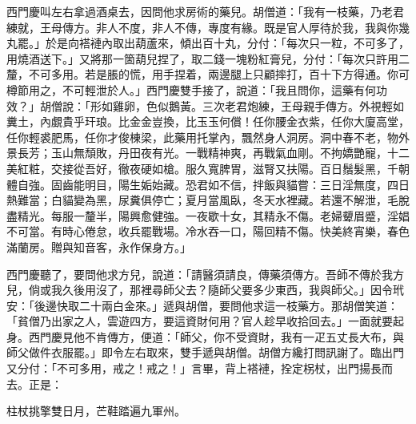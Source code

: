 西門慶叫左右拿過酒桌去，因問他求房術的藥兒。胡僧道：「我有一枝藥，乃老君練就，王母傳方。非人不度，非人不傳，專度有緣。既是官人厚待於我，我與你幾丸罷。」於是向褡褳內取出葫蘆來，傾出百十丸，分付：「每次只一粒，不可多了，用燒酒送下。」又將那一箇葫兒捏了，取二錢一塊粉紅膏兒，分付：「每次只許用二釐，不可多用。若是脹的慌，用手捏着，兩邊腿上只顧摔打，百十下方得通。你可樽節用之，不可輕泄於人。」西門慶雙手接了，說道：「我且問你，這藥有何功效？」胡僧說：「形如雞卵，色似鵝黃。三次老君炮練，王母親手傳方。外視輕如糞土，內覷貴乎玕琅。比金金豈換，比玉玉何償！任你腰金衣紫，任你大廈高堂，任你輕裘肥馬，任你才俊棟梁，此藥用托掌內，飄然身人洞房。洞中春不老，物外景長芳；玉山無頹敗，丹田夜有光。一戰精神爽，再戰氣血剛。不拘嬌艷寵，十二美紅粧，交接從吾好，徹夜硬如槍。服久寬脾胃，滋腎又扶陽。百日鬚髮黑，千朝體自強。固齒能明目，陽生姤始藏。恐君如不信，拌飯與貓嘗：三日淫無度，四日熱難當；白貓變為黑，尿糞俱停亡；夏月當風臥，冬天水裡藏。若還不解泄，毛脫盡精光。每服一釐半，陽興愈健強。一夜歇十女，其精永不傷。老婦顰眉蹙，淫娼不可當。有時心倦怠，收兵罷戰場。冷水吞一口，陽回精不傷。快美終宵樂，春色滿蘭房。贈與知音客，永作保身方。」

西門慶聽了，要問他求方兒，說道：「請醫須請良，傳藥須傳方。吾師不傳於我方兒，倘或我久後用沒了，那裡尋師父去？隨師父要多少東西，我與師父。」因令玳安：「後邊快取二十兩白金來。」遞與胡僧，要問他求這一枝藥方。那胡僧笑道：「貧僧乃出家之人，雲遊四方，要這資財何用？{}官人趁早收拾回去。」一面就要起身。西門慶見他不肯傳方，便道：「師父，你不受資財，我有一疋五丈長大布，與師父做件衣服罷。」即令左右取來，雙手遞與胡僧。胡僧方纔打問訊謝了。臨出門又分付：「不可多用，戒之！戒之！」言畢，背上褡褳，拴定柺杖，出門揚長而去。正是：

\begin{myquote} 
柱杖挑擎雙日月，芒鞋踏遍九軍州。
\end{myquote} 


